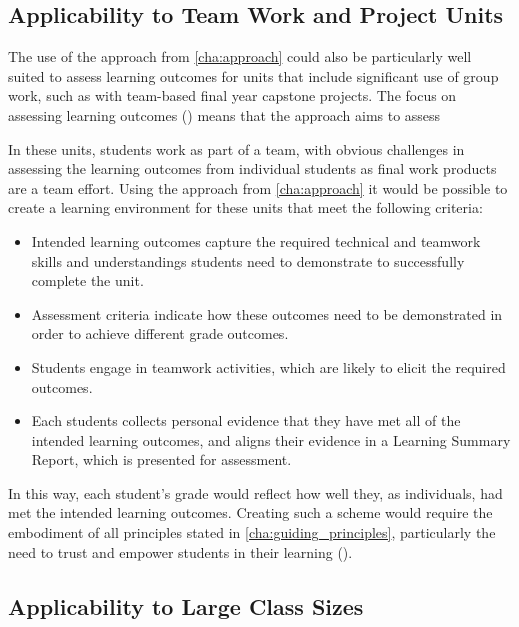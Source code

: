 \subsection{Applicability to Team Work and Project Units} %
\label{sub:applic}

The use of the approach from \cref{cha:approach} could also be particularly well suited to assess learning outcomes for units that include significant use of group work, such as with team-based final year capstone projects. The focus on assessing learning outcomes () means that the approach aims to assess 

In these units, students work as part of a team, with obvious challenges in assessing the learning outcomes from individual students as final work products are a team effort. Using the approach from \cref{cha:approach} it would be possible to create a learning environment for these units that meet the following criteria:
\begin{itemize}[noitemsep,nolistsep]
	\item Intended learning outcomes capture the required technical and teamwork skills and understandings students need to demonstrate to successfully complete the unit.
	\item Assessment criteria indicate how these outcomes need to be demonstrated in order to achieve different grade outcomes.
	\item Students engage in teamwork activities, which are likely to elicit the required outcomes.
	\item Each students collects personal evidence that they have met all of the intended learning outcomes, and aligns their evidence in a Learning Summary Report, which is presented for assessment.
\end{itemize}

In this way, each student's grade would reflect how well they, as individuals, had met the intended learning outcomes. Creating such a scheme would require the embodiment of all principles stated in \cref{cha:guiding_principles}, particularly the need to trust and empower students in their learning ().

\subsection{Applicability to Large Class Sizes} %
\label{sub:appli}


